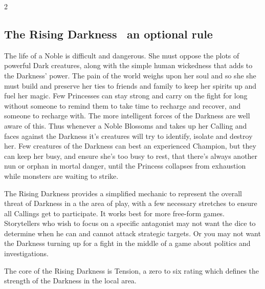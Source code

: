 \begin{multicols}{2}
\subsection*{The Rising Darkness \textemdash\, an optional rule}

\label{RisingDarkness}
The life of a Noble is difficult and dangerous. She must oppose the plots of powerful Dark creatures, along with the simple human wickedness that adds to the Darkness’ power. The pain of the world weighs upon her soul and so she she must build and preserve her ties to friends and family to keep her spirits up and fuel her magic. Few Princesses can stay strong and carry on the fight for long without someone to remind them to take time to recharge and recover, and someone to recharge with. The more intelligent forces of the Darkness are well aware of this. Thus whenever a Noble Blossoms and takes up her Calling and faces against the Darkness it's creatures will try to identify, isolate and destroy her. Few creatures of the Darkness can best an experienced Champion, but they can keep her busy, and ensure she's too busy to rest, that there's always another nun or orphan in mortal danger, until the Princess collapses from exhaustion while monsters are waiting to strike. 

The Rising Darkness provides a simplified mechanic to represent the overall threat of Darkness in a the area of play, with a few necessary stretches to ensure all Callings get to participate. It works best for more free-form games. Storytellers who wish to focus on a specific antagonist may not want the dice to determine when he can and cannot attack strategic targets. Or you may not want the Darkness turning up for a fight in the middle of a game about politics and investigations. 

The core of the Rising Darkness is Tension, a zero to six rating which defines the strength of the Darkness in the local area. 



\end{multicols}
